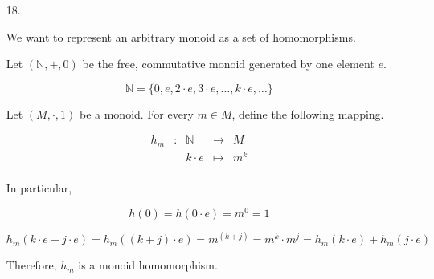 \documentclass[notitlepage,a4paper]{article}
\begin{document}
\begin{enumerate}
\begin{enumerate}

  \end{enumerate}

   $h_U^{-1}(⊤) = U$ and $h_{f^{-1}(⊤)} = f$ . Therefore, constructions
   are inverses of each other, and define an isomorphism.
  
     
  \item[18.]

    We want to represent an arbitrary monoid as a set of homomorphisms.
    
    Let $(\mathbb{N}, +, 0)$ be the free, commutative monoid generated
    by one element $e$.

    $$\mathbb{N} = \{ 0, e, 2·e, 3·e, …, k·e, … \}$$


    Let $(M,·,1)$ be a monoid. For every $m \in M$, define the
    following mapping.

    \begin{align*}
    h_m & : & \mathbb{N} & →        & M   \\
        &   &     k·e    & \mapsto  & m^k \\
    \end{align*}

    In particular,

    $$h(0) = h(0·e) = m^0 = 1$$ 
    
    $$h_m(k·e + j·e) = h_m((k+j)·e) = m^(k+j) = m^k · m^j = h_m(k·e) + h_m(j·e)$$

    Therefore, $h_m$ is a monoid homomorphism.


\end{enumerate}
\end{document}
